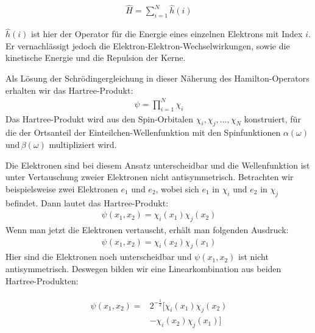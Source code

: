 \begin{align}
\label{Näherung}
\hat{H}=\sum^{N}_{i=1}\hat{h}(i)
\end{align}

$\hat{h}(i)$ ist hier der Operator für die Energie eines einzelnen Elektrons mit Index $i$. Er vernachlässigt jedoch die Elektron-Elektron-Wechselwirkungen, sowie die kinetische Energie und die Repulsion der Kerne.

Als Lösung der Schrödingergleichung in dieser Näherung des Hamilton-Operators erhalten wir das Hartree-Produkt:
\begin{align}
\psi = \prod^{N}_{i=1} \chi_i
\end{align}
Das Hartree-Produkt wird aus den Spin-Orbitalen $\chi_i, \chi_j,\dots,\chi_N$ konstruiert, für die der Ortsanteil der Einteilchen-Wellenfunktion mit den Spinfunktionen $\alpha(\omega)\,$und$\,\beta(\omega)$ multipliziert wird.



Die Elektronen sind bei diesem Ansatz unterscheidbar und die Wellenfunktion ist unter Vertauschung zweier Elektronen nicht antisymmetrisch. Betrachten wir beispielsweise zwei Elektronen $e_1$ und $e_2$, wobei sich $e_1$ in $\chi_i$ und $e_2$ in $\chi_j$ befindet. Dann lautet das Hartree-Produkt:
\begin{align}
\psi(x_1,x_2)=\chi_i(x_1)\chi_j(x_2)
\end{align} 
Wenn man jetzt die Elektronen vertauscht, erhält man folgenden Ausdruck:
\begin{align}
\psi(x_1,x_2)=\chi_i(x_2)\chi_j(x_1)
\end{align}
Hier sind die Elektronen noch unterscheidbar und $\psi(x_1,x_2)$ ist nicht antisymmetrisch. Deswegen bilden wir eine Linearkombination aus beiden Hartree-Produkten:

\begin{align}\label{eq:lincomb}
\begin{split}
\psi(x_1,x_2)=&2^{-\frac{1}{2}}[\chi_i(x_1)\chi_j(x_2)\\&-\chi_i(x_2)\chi_j(x_1)]
\end{split}
\end{align}

